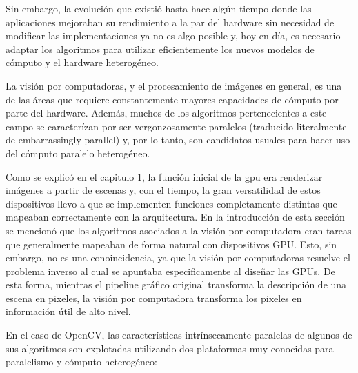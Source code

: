 \documentclass[a4paper,10pt]{report}
\begin{document}
Sin embargo, la evolución que existió hasta hace algún tiempo donde las aplicaciones mejoraban su rendimiento a la par del hardware sin necesidad de modificar las implementaciones ya no es algo posible y, hoy en día, es necesario
adaptar los algoritmos para utilizar eficientemente los nuevos modelos de cómputo y el hardware heterogéneo.



La visión por computadoras, y el procesamiento de imágenes en general, es una de las áreas que requiere constantemente mayores capacidades de cómputo por parte del hardware. 
Además, muchos de los algoritmos pertenecientes a este campo se caracterízan por ser vergonzosamente paralelos (traducido literalmente de embarrassingly parallel) y,
por lo tanto, son candidatos usuales para hacer uso del cómputo paralelo heterogéneo.

Como se explicó en el capitulo 1, la función inicial de la gpu era renderizar imágenes a partir de escenas y, con el tiempo, la gran versatilidad de estos dispositivos llevo a que se implementen funciones completamente distintas que mapeaban correctamente con la arquitectura. 
En la introducción de esta sección se mencionó que los algoritmos asociados a la visión por computadora eran tareas que generalmente mapeaban de forma natural con dispositivos GPU. 
Esto, sin embargo, no es una conoincidencia, ya que la visión por computadoras resuelve el problema inverso al cual se apuntaba especificamente al diseñar las GPUs.
De esta forma, mientras el pipeline gráfico original transforma la descripción de una escena en pixeles, la visión por computadora transforma los pixeles en información útil de alto nivel.


En el caso de OpenCV, las características intrínsecamente paralelas de algunos de sus algoritmos son explotadas utilizando dos plataformas muy conocidas para paralelismo y cómputo heterogéneo:
\end{document}

